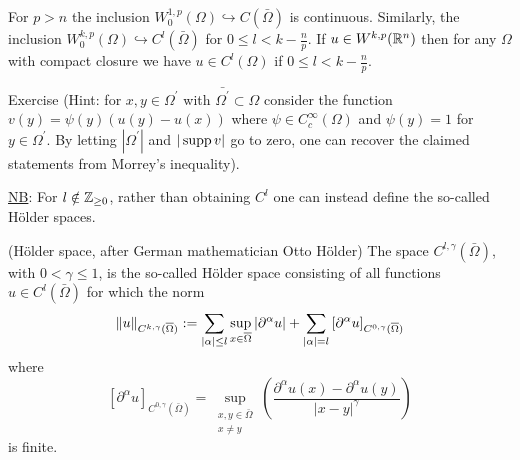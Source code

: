 \documentclass[11pt]{article}
\begin{document}
    		\begin{cor}
    			For $p>n$ the inclusion $W^{1,p}_0(\Omega)\hookrightarrow C(\bar{\Omega})$ is continuous. Similarly, the inclusion $W^{k,p}_0(\Omega)\hookrightarrow C^l(\bar{\Omega})$ for $0\le l<k-\frac{n}{p}$. If $u\in W^{k,p}(\mathbb{R}^n)$ then for any $\Omega$ with compact closure we have $u\in C^l(\Omega)$ if $0\le l<k-\frac{n}{p}$.
    		\end{cor}
    		\begin{pproof}
    			Exercise (Hint: for $x,y\in\Omega^\prime$ with $\bar{\Omega^\prime}\subset\Omega$ consider the function $v(y)=\psi(y)(u(y)-u(x))$ where $\psi\in C^\infty_c(\Omega)$ and $\psi(y)=1$ for $y\in\Omega^\prime$. By letting $|\Omega^\prime|$ and $|\operatorname{supp} v|$ go to zero, one can recover the claimed statements from Morrey's inequality).
    		\end{pproof}
    
    		\noindent\underline{NB}: For $l\notin\mathbb{Z}_{\ge0}$, rather than obtaining $C^l$ one can instead define the so-called H{\"o}lder spaces.
    
    		\begin{defi}
    			(H{\"o}lder space, after German mathematician Otto H\"older) The space $C^{l,\gamma}(\bar{\Omega})$, with $0<\gamma\le1$, is the so-called H{\"o}lder space consisting of all functions $u\in C^l(\bar{\Omega})$ for which the norm
    			\begin{equation*}	\norm{u}_{C^{k,\gamma}(\overline{\Omega})}:=\sum_{|\alpha|\le l}\sup_{x\in\overline{\Omega}}|\partial^\alpha u|+\sum_{|\alpha|=l}\left[\partial^\alpha u\right]_{C^{0,\gamma}(\overline{\Omega})}
    			\end{equation*}
    			where
    			\begin{equation*}
    				\left[\partial^\alpha u\right]_{C^{0,\gamma}(\bar{\Omega})}=\sup_{\substack{x,y\in\bar{\Omega}\\x\neq y}}\left(\frac{\partial^\alpha u(x)-\partial^\alpha u(y)}{|x-y|^\gamma}\right)
    			\end{equation*}
    			is finite.
    		\end{defi}
    
\end{document}
